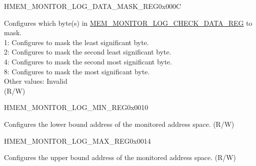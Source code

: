 \begin{register}{H}{MEM\_MONITOR\_LOG\_DATA\_MASK\_REG}{0x000C}\label{regdesc:MEMMONITORLOGDATAMASKREG}
%
%
\regnewline%
\begin{regdesc}\begin{reglist}
\label{fielddesc:MEMMONITORLOGDATAMASK}\item [MEM\_MONITOR\_LOG\_DATA\_MASK] Configures which byte(s) in \hyperref[regdesc:MEMMONITORLOGCHECKDATAREG]{MEM\_MONITOR\_LOG\_CHECK\_DATA\_REG} to mask.\\
1: Configures to mask the least significant byte.\\
2: Configures to mask the second least significant byte.\\
4: Configures to mask the second most significant byte.\\
8: Configures to mask the most significant byte.\\
Other values: Invalid \\ (R/W)
\end{reglist}\end{regdesc}
\end{register}


\begin{register}{H}{MEM\_MONITOR\_LOG\_MIN\_REG}{0x0010}\label{regdesc:MEMMONITORLOGMINREG}
%
\regnewline%
\begin{regdesc}\begin{reglist}
\label{fielddesc:MEMMONITORLOGMIN}\item [MEM\_MONITOR\_LOG\_MIN] Configures the lower bound address of the monitored address space. (R/W)
\end{reglist}\end{regdesc}
\end{register}


\begin{register}{H}{MEM\_MONITOR\_LOG\_MAX\_REG}{0x0014}\label{regdesc:MEMMONITORLOGMAXREG}
%
\regnewline%
\begin{regdesc}\begin{reglist}
\label{fielddesc:MEMMONITORLOGMAX}\item [MEM\_MONITOR\_LOG\_MAX] Configures the upper bound address of the monitored address space. (R/W)
\end{reglist}\end{regdesc}
\end{register}


